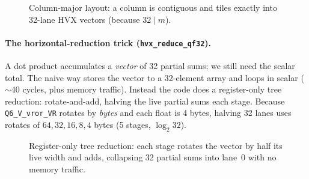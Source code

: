 \documentclass[11pt]{article}
\newcommand{\code}[1]{\texttt{\small #1}}
\begin{document}
\begin{figure}[h]
\centering
{}
\caption{Column-major layout: a column is contiguous and tiles exactly into 32-lane
HVX vectors (because $32 \mid m$).}
\end{figure}

\paragraph{The horizontal-reduction trick (\code{hvx\_reduce\_qf32}).}
A dot product accumulates a \emph{vector} of 32 partial sums; we still need the scalar
total. The naive way stores the vector to a 32-element array and loops in scalar
($\sim$40 cycles, plus memory traffic). Instead the code does a register-only
tree reduction: rotate-and-add, halving the live partial sums each stage. Because
\code{Q6\_V\_vror\_VR} rotates by \emph{bytes} and each float is 4 bytes, halving 32
lanes uses rotates of $64,32,16,8,4$ bytes (5 stages, $\log_2 32$).

\begin{figure}[h]
\centering
{}
\caption{Register-only tree reduction: each stage rotates the vector by half its live
width and adds, collapsing 32 partial sums into lane~0 with no memory traffic.}
\end{figure}
\end{document}

